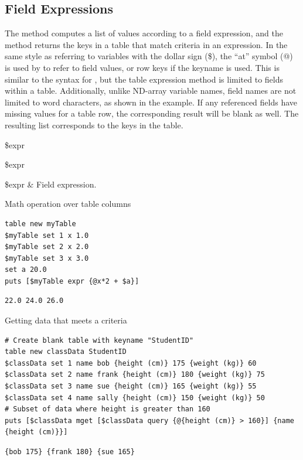 \subsection{Field Expressions}
The method  computes a list of values according to a field expression, and the method  returns the keys in a table that match criteria in an expression.
In the same style as referring to variables with the dollar sign (\$), the ``at'' symbol (@) is used by  to refer to field values, or row keys if the keyname is used. 
This is similar to the syntax for , but the table expression method is limited to fields within a table.
Additionally, unlike ND-array variable names, field names are not limited to word characters, as shown in the example. 
If any referenced fields have missing values for a table row, the corresponding result will be blank as well. 
The resulting list corresponds to the keys in the table.
\begin{syntax}
 \$expr
\end{syntax}
\begin{syntax}
 \$expr
\end{syntax}
\begin{args}
\$expr & Field expression.
\end{args}
\begin{example}{Math operation over table columns}
\begin{lstlisting}
table new myTable
$myTable set 1 x 1.0 
$myTable set 2 x 2.0
$myTable set 3 x 3.0
set a 20.0
puts [$myTable expr {@x*2 + $a}]
\end{lstlisting}
\tcblower
\begin{lstlisting}
22.0 24.0 26.0
\end{lstlisting}
\end{example}
\begin{example}{Getting data that meets a criteria}
\begin{lstlisting}
# Create blank table with keyname "StudentID"
table new classData StudentID
$classData set 1 name bob {height (cm)} 175 {weight (kg)} 60
$classData set 2 name frank {height (cm)} 180 {weight (kg)} 75
$classData set 3 name sue {height (cm)} 165 {weight (kg)} 55
$classData set 4 name sally {height (cm)} 150 {weight (kg)} 50
# Subset of data where height is greater than 160
puts [$classData mget [$classData query {@{height (cm)} > 160}] {name {height (cm)}}]
\end{lstlisting}
\tcblower
\begin{lstlisting}
{bob 175} {frank 180} {sue 165}
\end{lstlisting}
\end{example}

